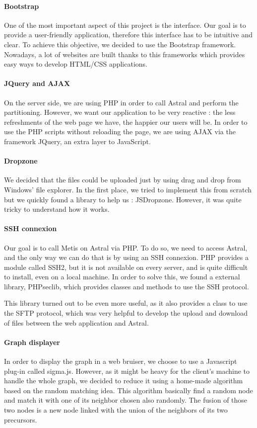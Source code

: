 \documentclass{cranfieldChart}
\begin{document}
\paragraph{Bootstrap}
One of the most important aspect of this project is the interface. Our goal is to provide a user-friendly application, therefore this interface has to be intuitive and clear. To achieve this objective, we decided to use the Bootstrap framework. Nowadays, a lot of websites are built thanks to this frameworks which provides easy ways to develop HTML/CSS applications.

\paragraph{JQuery and AJAX}
On the server side, we are using PHP in order to call Astral and perform the partitioning. However, we want our application to be very reactive : the less refreshments of the web page we have, the happier our users will be. In order to use the PHP scripts without reloading the page, we are using AJAX via the framework JQuery, an extra layer to JavaScript.

\paragraph{Dropzone}
We decided that the files could be uploaded just by using drag and drop from Windows' file explorer. In the first place, we tried to implement this from scratch but we quickly found a library to help us : JSDropzone. However, it was quite tricky to understand how it works.

\paragraph{SSH connexion}
Our goal is to call Metis on Astral via PHP. To do so, we need to access Astral, and the only way we can do that is by using an SSH connexion. PHP provides a module called SSH2, but it is not available on every server, and is quite difficult to install, even on a local machine. In order to solve this, we found a external library, PHPseclib, which provides classes and methods to use the SSH protocol.

This library turned out to be even more useful, as it also provides a class to use the SFTP protocol, which was very helpful to develop the upload and download of files between the web application and Astral.

\paragraph{Graph displayer}
In order to display the graph in a web bruiser, we choose to use a Javascript plug-in called sigma.js. However, as it might be heavy for the client's machine to handle the whole graph, we decided to reduce it using a home-made algorithm based on the random matching idea. This algorithm basically find a random node and match it with one of its neighbor chosen also randomly. The fusion of those two nodes is a new node linked with the union of the neighbors of its two precursors.
\end{document}
